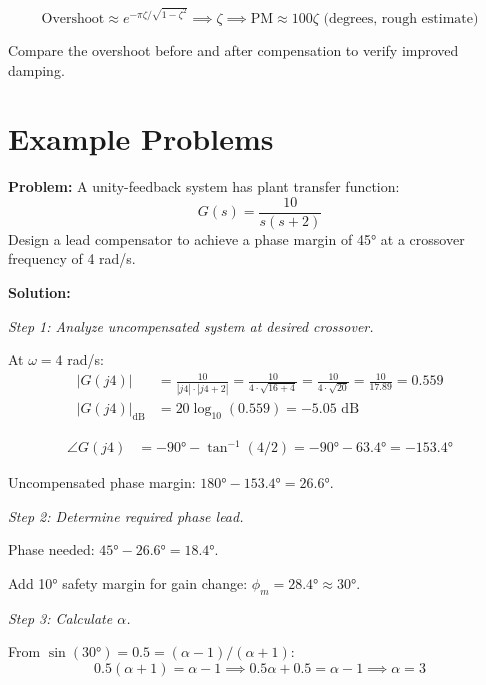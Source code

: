 \begin{equation}
\text{Overshoot} \approx e^{-\pi\zeta/\sqrt{1-\zeta^2}} \implies \zeta \implies \text{PM} \approx 100\zeta \text{ (degrees, rough estimate)}
\end{equation}

Compare the overshoot before and after compensation to verify improved damping.

\section{Example Problems}
\label{sec:lead_lag_examples}

\begin{examplebox}
\textbf{Problem:} A unity-feedback system has plant transfer function:
\[
G(s) = \frac{10}{s(s+2)}
\]
Design a lead compensator to achieve a phase margin of 45° at a crossover frequency of 4 rad/s.

\textbf{Solution:}

\textit{Step 1: Analyze uncompensated system at desired crossover.}

At $\omega = 4$ rad/s:
\begin{align}
|G(j4)| &= \frac{10}{|j4| \cdot |j4+2|} = \frac{10}{4 \cdot \sqrt{16+4}} = \frac{10}{4 \cdot \sqrt{20}} = \frac{10}{17.89} = 0.559 \\
|G(j4)|_{\text{dB}} &= 20\log_{10}(0.559) = -5.05 \text{ dB}
\end{align}

\begin{align}
\angle G(j4) &= -90° - \tan^{-1}(4/2) = -90° - 63.4° = -153.4°
\end{align}

Uncompensated phase margin: $180° - 153.4° = 26.6°$.

\textit{Step 2: Determine required phase lead.}

Phase needed: $45° - 26.6° = 18.4°$.

Add 10° safety margin for gain change: $\phi_m = 28.4° \approx 30°$.

\textit{Step 3: Calculate $\alpha$.}

From $\sin(30°) = 0.5 = (\alpha-1)/(\alpha+1)$:
\[
0.5(\alpha+1) = \alpha - 1 \implies 0.5\alpha + 0.5 = \alpha - 1 \implies \alpha = 3
\]


\end{examplebox}
